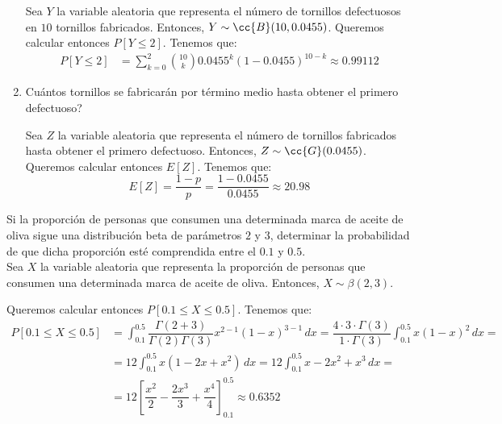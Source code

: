\begin{ejercicio}
\begin{enumerate}
        Sea $Y$ la variable aleatoria que representa el número de tornillos defectuosos en $10$ tornillos fabricados. Entonces, $Y\sim \cc{B}(10,0.0455)$.
        Queremos calcular entonces $P[Y\leq 2]$. Tenemos que:
        \begin{align*}
            P[Y\leq 2] &= \sum_{k=0}^{2} \binom{10}{k} 0.0455^k (1-0.0455)^{10-k}
            \approx 0.99112
        \end{align*}
        \item Cuántos tornillos se fabricarán por término medio hasta obtener el primero defectuoso?
        
        Sea $Z$ la variable aleatoria que representa el número de tornillos fabricados hasta obtener el primero defectuoso. Entonces, $Z\sim \cc{G}(0.0455)$.
        Queremos calcular entonces $E[Z]$. Tenemos que:
        \begin{equation*}
            E[Z] = \dfrac{1-p}{p} = \dfrac{1-0.0455}{0.0455} \approx 20.98
        \end{equation*}
    \end{enumerate}
\end{ejercicio}

\begin{ejercicio}
    Si la proporción de personas que consumen una determinada marca de aceite de oliva sigue una distribución beta de parámetros $2$ y $3$, determinar la probabilidad de que dicha proporción esté comprendida entre el $0.1$ y $0.5$.\\

    Sea $X$ la variable aleatoria que representa la proporción de personas que consumen una determinada marca de aceite de oliva. Entonces, $X\sim \beta(2,3)$.

    Queremos calcular entonces $P[0.1\leq X\leq 0.5]$. Tenemos que:
    \begin{align*}
        P[0.1\leq X\leq 0.5] &= \int_{0.1}^{0.5} \dfrac{\Gamma(2+3)}{\Gamma(2)\Gamma(3)} x^{2-1} (1-x)^{3-1} \, dx = 
        \dfrac{4\cdot 3\cdot \Gamma(3)}{1\cdot \Gamma(3)}
        \int_{0.1}^{0.5} x (1-x)^{2} \, dx
        =\\&= 12\int_{0.1}^{0.5} x(1-2x+x^2) \, dx
        = 
        12\int_{0.1}^{0.5} x-2x^2+x^3 \, dx
        =\\&= 12\left[\dfrac{x^2}{2}-\dfrac{2x^3}{3}+\dfrac{x^4}{4}\right]_{0.1}^{0.5}
        \approx 0.6352
    \end{align*}
\end{ejercicio}

